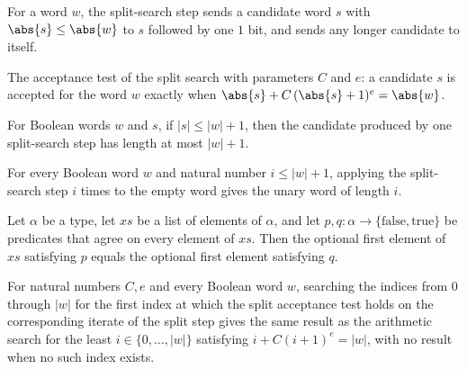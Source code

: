 \begin{definition}
\label{Turing.FinTM.splitStep}
\leanok
For a word $w$, the split-search step sends a candidate word $s$ with
$\abs{s} \le \abs{w}$ to $s$ followed by one $1$ bit, and sends any longer
candidate to itself.
\end{definition}

\begin{definition}
\label{Turing.FinTM.splitAccept}
\leanok
The acceptance test of the split search with parameters $C$ and $e$: a
candidate $s$ is accepted for the word $w$ exactly when
$\abs{s} + C\,(\abs{s}+1)^{e} = \abs{w}$.
\end{definition}

\begin{lemma}
\label{Turing.FinTM.splitStep_inv}
\leanok
{}
For Boolean words $w$ and $s$, if $|s|\le |w|+1$, then the candidate produced by one
split-search step has length at most $|w|+1$.
\end{lemma}

\begin{lemma}
\label{Turing.FinTM.splitStep_orbit}
\leanok
{}
For every Boolean word $w$ and natural number $i\le |w|+1$, applying the split-search
step $i$ times to the empty word gives the unary word of length $i$.
\end{lemma}

\begin{lemma}
\label{Turing.FinTM.catalogFind_congr}
\leanok
{}
Let $\alpha$ be a type, let $xs$ be a list of elements of $\alpha$, and let
$p,q:\alpha\to\{\mathrm{false},\mathrm{true}\}$ be predicates that agree on every
element of $xs$. Then the optional first element of $xs$ satisfying $p$ equals the
optional first element satisfying $q$.
\end{lemma}

\begin{lemma}
\label{Turing.FinTM.splitFind_eq}
\leanok
{}
For natural numbers $C,e$ and every Boolean word $w$, searching the indices from $0$
through $|w|$ for the first index at which the split acceptance test holds on the
corresponding iterate of the split step gives the same result as the arithmetic search
for the least $i\in\{0,\ldots,|w|\}$ satisfying $i+C(i+1)^e=|w|$, with no result when no
such index exists.
\end{lemma}

